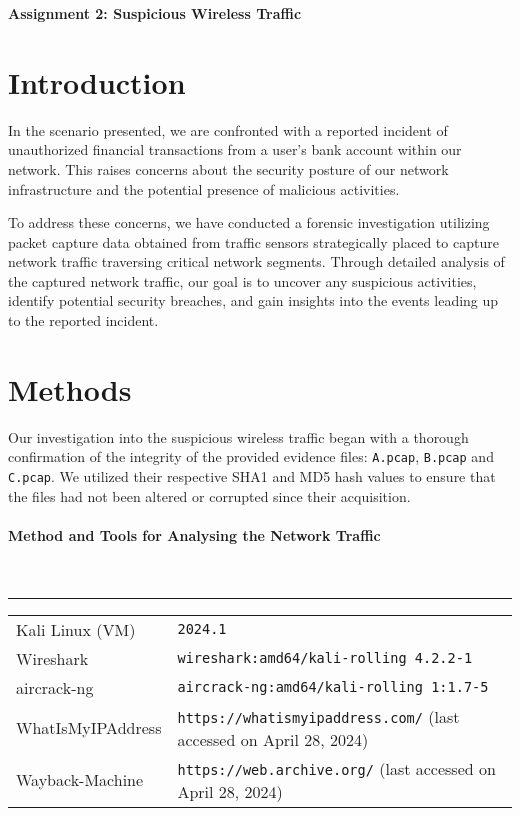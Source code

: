 \centerline{\LARGE{\textbf{Assignment 2: Suspicious Wireless Traffic}}}
\section{Introduction}
In the scenario presented, we are confronted with a reported incident of unauthorized financial transactions from a user's bank account within our network. This raises concerns about the security posture of our network infrastructure and the potential presence of malicious activities.
\newline

\noindent To address these concerns, we have conducted a forensic investigation utilizing packet capture data obtained from traffic sensors strategically placed to capture network traffic traversing critical network segments. Through detailed analysis of the captured network traffic, our goal is to uncover any suspicious activities, identify potential security breaches, and gain insights into the events leading up to the reported incident.
\section{Methods}
Our investigation into the suspicious wireless traffic began with a thorough confirmation of the integrity of the provided evidence files: \texttt{A.pcap}, \texttt{B.pcap} and \texttt{C.pcap}. We utilized their respective SHA1 and MD5 hash values to ensure that the files had not been altered or corrupted since their acquisition.

\paragraph{Method and Tools for Analysing the Network Traffic}\mbox{}\\
\noindent\rule{\textwidth}{1pt}
\vspace{-0.8cm}
\begin{table}[h]
\begin{tabular}{ll}
Kali Linux (VM) & \texttt{2024.1}                                 \\
Wireshark      & \texttt{wireshark:amd64/kali-rolling 4.2.2-1} \\
aircrack-ng      & \texttt{aircrack-ng:amd64/kali-rolling 1:1.7-5} \\
WhatIsMyIPAddress   & \texttt{https://whatismyipaddress.com/}  (last accessed on April 28, 2024) \\
Wayback-Machine   & \texttt{https://web.archive.org/}  (last accessed on April 28, 2024)
\end{tabular}
\end{table}

